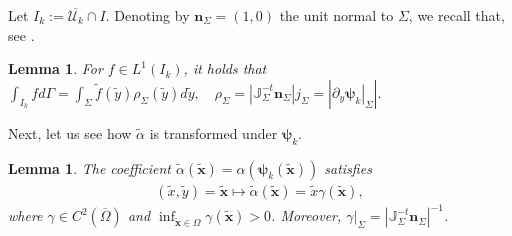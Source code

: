 \documentclass[report]{elsarticle}
\newtheorem{lemma}[theorem]{Lemma}
\numberwithin{theorem}{section}
\newcommand{\tbx}{\widetilde{\mathbf{x}}}
\newcommand{\bpsi}{\boldsymbol{\psi}}
\renewcommand{\vec}[1]{\mathbf{#1}}
\begin{document}
Let $I_k:=\overline{\mathcal{U}_k}\cap I$. Denoting by $\vec{n}_{\Sigma}=(1,0)$ the unit normal to $\Sigma$, we recall that, see \cite[(2.1.62), (2.1.58)]{boffi}.
\begin{lemma}
	\label{lem:transformations}
	For $f\in L^1(I_k)$, it holds that 
$
		\int_{I_k}fd\Gamma=\int_{\Sigma}\widetilde{f}(\widetilde{y})\rho_{\Sigma}(\tilde{y})d\tilde{y}, \quad \rho_{\Sigma}=|\mathbb{J}^{-t}_{\Sigma}\vec{n}_{\Sigma}|j_{\Sigma}=|\left.\partial_{y}\bpsi_k\right|_{\Sigma}|.
$
\end{lemma}
Next, let us see how $\widetilde{\alpha}$ is transformed under $\vec{\bpsi}_k$. 
\begin{lemma}
	\label{lem:alphadef}
	The coefficient $\widetilde{\alpha}(\tbx)=\alpha(\bpsi_k(\tbx))$ satisfies 
	\begin{align*}
	(\tilde{x},\tilde{y})=\tbx\mapsto \widetilde{\alpha}(\tbx)=\tilde{x}\gamma(\tbx),
\end{align*}
where   $\gamma\in C^{2}(\overline{\Omega})$ and  $ \inf_{\tbx\in \Omega}\gamma(\tbx)>0$.  Moreover, $\left. \gamma\right|_{\Sigma}=|\mathbb{J}^{-t}_{\Sigma}\vec{n}_{\Sigma}|^{-1}$. 
\end{lemma}
\end{document}

